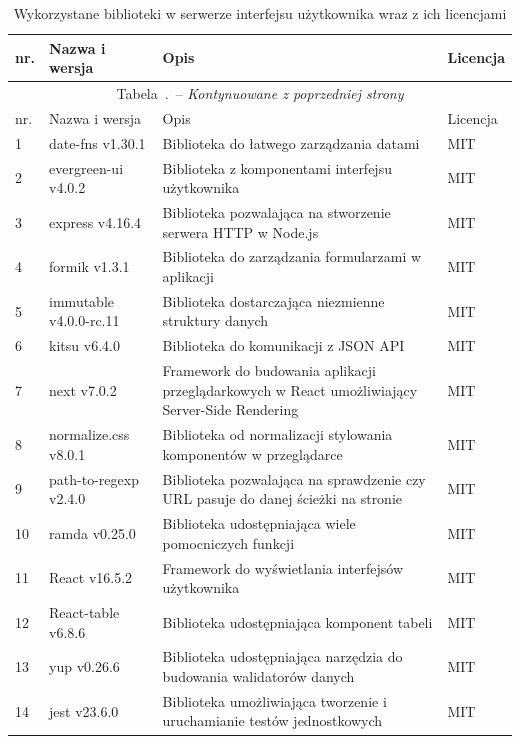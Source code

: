 \documentclass[a4paper,11pt,twoside]{report}
\renewcommand{\tablename}{Tabela}
\renewcommand*{\thetable}{\arabic{chapter}.\arabic{table}}
\theoremstyle{definition}
\begin{document}
        \begin{center}
            \begin{longtable}{| p{} | p{} | p{} | p{} |}
                \caption{Wykorzystane biblioteki w serwerze interfejsu użytkownika wraz z ich licencjami}
                \label{biblioteki-frontend} \\
                \hline
                nr. & Nazwa i wersja & Opis & Licencja \\ \hline
                \endfirsthead
                \multicolumn{4}{c}{\tablename\ \thetable\ -- \textit{Kontynuowane z poprzedniej strony}} \\
                \hline
                nr. & Nazwa i wersja & Opis & Licencja \\ \hline
                \endhead
                
                1 & date-fns v1.30.1 & Biblioteka do łatwego zarządzania datami & MIT \\ \hline
                2 & evergreen-ui v4.0.2 & Biblioteka z komponentami interfejsu użytkownika & MIT \\ \hline
                3 & express v4.16.4 & Biblioteka pozwalająca na stworzenie serwera HTTP w Node.js & MIT \\ \hline
                4 & formik v1.3.1 & Biblioteka do zarządzania formularzami w aplikacji & MIT \\ \hline
                5 & immutable v4.0.0-rc.11 & Biblioteka dostarczająca niezmienne struktury danych & MIT \\ \hline
                6 & kitsu v6.4.0 & Biblioteka do komunikacji z JSON API & MIT \\ \hline
                7 & next v7.0.2 & Framework do budowania aplikacji przeglądarkowych w React umożliwiający Server-Side Rendering & MIT \\ \hline
                8 & normalize.css v8.0.1 & Biblioteka od normalizacji stylowania komponentów w przeglądarce & MIT \\ \hline
                9 & path-to-regexp v2.4.0 & Biblioteka pozwalająca na sprawdzenie czy URL pasuje do danej ścieżki na stronie & MIT \\ \hline
                10 & ramda v0.25.0 & Biblioteka udostępniająca wiele pomocniczych funkcji & MIT \\ \hline
                11 & React v16.5.2 & Framework do wyświetlania interfejsów użytkownika & MIT \\ \hline
                12 & React-table v6.8.6 & Biblioteka udostępniająca komponent tabeli & MIT \\ \hline
                13 & yup v0.26.6 & Biblioteka udostępniająca narzędzia do budowania walidatorów danych & MIT \\ \hline
                14 & jest v23.6.0 & Biblioteka umożliwiająca tworzenie i uruchamianie testów jednostkowych & MIT \\ \hline
            \end{longtable}
        \end{center}
    
\end{document}

